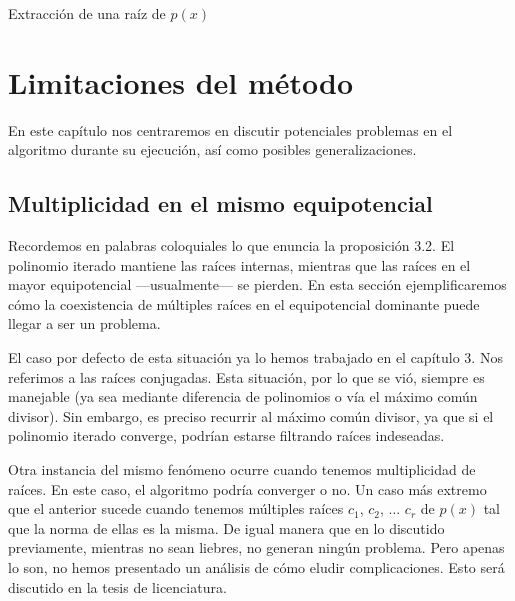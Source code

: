 \documentclass[oneside,11pt]{book}
\theoremstyle{definition}
\theoremstyle{plain}
\theoremstyle{remark}
\begin{document}
\begin{algorithm}[H]
 \caption{Extracci\'on de una ra\'iz de $p(x)$}
 
  \SetAlgoLined\DontPrintSemicolon
\medskip

\end{algorithm}


\chapter{Limitaciones del m\'etodo}

En este cap\'itulo nos centraremos en discutir potenciales problemas en el algoritmo durante su ejecuci\'on, 
as\'i como posibles generalizaciones.
\medskip

\section{Multiplicidad en el mismo equipotencial}

Recordemos en palabras coloquiales lo que enuncia la proposici\'on 3.2. 
El polinomio iterado mantiene las ra\'ices internas, mientras que las ra\'ices en el mayor equipotencial ---usualmente--- se pierden.
En esta secci\'on ejemplificaremos c\'omo la coexistencia 
de m\'ultiples ra\'ices en el equipotencial dominante puede llegar a ser un problema.

El caso por defecto de esta situaci\'on ya lo hemos trabajado en el cap\'itulo 3. 
Nos referimos a las ra\'ices conjugadas. 
Esta situaci\'on, por lo que se vi\'o, siempre es manejable (ya sea mediante diferencia de polinomios o 
v\'ia el m\'aximo com\'un divisor). 
Sin embargo, es preciso recurrir al m\'aximo com\'un divisor, 
ya que si el polinomio iterado converge, podr\'ian estarse filtrando ra\'ices indeseadas.

Otra instancia del mismo fen\'omeno ocurre cuando tenemos multiplicidad de ra\'ices. 
En este caso, el algoritmo podr\'ia converger o no.
Un caso m\'as extremo que el anterior sucede cuando tenemos m\'ultiples ra\'ices $c_1$, $c_2$, ... $c_r$ de $p(x)$ tal que la norma de ellas es la misma.
De igual manera que en lo discutido previamente, 
mientras no sean liebres, no generan ning\'un problema.
Pero apenas lo son, no hemos presentado un an\'alisis de c\'omo eludir complicaciones.
Esto ser\'a discutido en la tesis de licenciatura.
\end{document}
